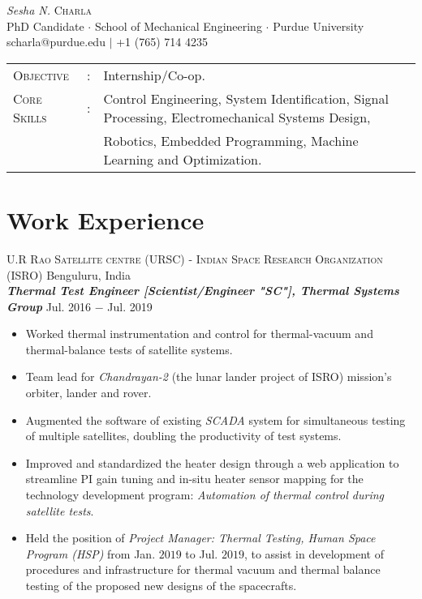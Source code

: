 \documentclass[letterpaper,10pt]{article}
\begin{document}
\begin{center}
\thispagestyle{empty}
\huge{\textit{Sesha N.} \textsc{Charla}}\\
\small PhD Candidate $\cdot$ School of Mechanical Engineering $\cdot$ Purdue University\\
\small scharla@purdue.edu $\mid$ +1 (765) 714 4235   \\
\end{center}



\begin{tabular}{l c l}
    {\large{\textsc{Objective}}}&:& Internship$/$Co-op.\\
	{\large{\textsc{Core Skills}}}&:& Control Engineering, System Identification, Signal Processing, Electromechanical Systems Design, \\
    & & Robotics, Embedded Programming, Machine Learning and Optimization.\\
\end{tabular}


\section{Work Experience}
\noindent \textsc{U.R Rao Satellite centre (URSC) - Indian Space Research Organization (ISRO)} \hfill Benguluru, India \\

\vspace{3pt}
\textbf{\textit{Thermal Test Engineer [Scientist/Engineer "SC"], Thermal Systems Group}} \hfill Jul. 2016 $-$ Jul. 2019
\begin{itemize}[noitemsep,nolistsep,leftmargin=0.25in,label={--}]
    \item Worked thermal instrumentation and control for thermal-vacuum and thermal-balance tests of satellite systems.
	\item Team lead for \textit{Chandrayan-2} (the lunar lander project of ISRO) mission's orbiter, lander and rover.
    \item Augmented the software of existing \textit{SCADA} system for simultaneous testing of multiple satellites, doubling the productivity of test systems.
	\item Improved and standardized the heater design through a web application to streamline PI gain tuning and in-situ heater sensor mapping for the technology development program: \textit{Automation of thermal control during satellite tests}.
    \item Held the position of \textit{Project Manager: Thermal Testing, Human Space Program (HSP)} from Jan. $2019$ to Jul. $2019$, to assist in development of procedures and infrastructure for thermal vacuum and thermal balance testing of the proposed new designs of the spacecrafts.\\
\end{itemize}
\end{document}
